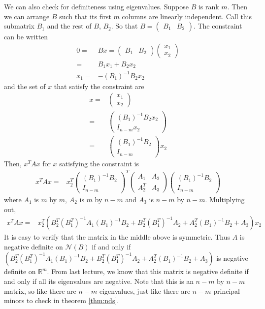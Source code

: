 \documentclass[12pt,reqno]{amsart}
\theoremstyle{definition}
\def\R{\mathbb{R}}
\begin{document}
We can also check for definiteness using eigenvalues. Suppose $B$ is
rank $m$. Then we can arrange $B$ such that its first $m$ columns are
linearly independent. Call this submatrix $B_1$ and the rest of $B$,
$B_2$. So that $B = \begin{pmatrix} B_1 & B_2 \end{pmatrix}$. The
constraint can be written
\begin{align*}
  0 = & B x = \begin{pmatrix} B_1 & B_2 \end{pmatrix} \begin{pmatrix}
    x_1 \\ x_2 \end{pmatrix} \\
  = & B_1 x_1 + B_2 x_2 \\
  x_1 = & -(B_1)^{-1} B_2 x_2
\end{align*}
and the set of $x$ that satisfy the constraint are
\begin{align*} x = & \begin{pmatrix} x_1 \\ x_2 \end{pmatrix} \\
  = & \begin{pmatrix}
    (B_1)^{-1} B_2 x_2 \\ I_{n-m} x_2 \end{pmatrix} \\
  = & \begin{pmatrix}
    (B_1)^{-1} B_2 \\ I_{n-m} \end{pmatrix} x_2
\end{align*}
Then, $x^T A x$ for $x$ satisfying the constraint is
\begin{align*}
  x^T A x = & x_2^T \begin{pmatrix}
    (B_1)^{-1} B_2 \\ I_{n-m} \end{pmatrix}^T \begin{pmatrix} A_1 & A_2
    \\ A_2^T & A_3 \end{pmatrix} \begin{pmatrix}
    (B_1)^{-1} B_2 \\ I_{n-m} \end{pmatrix}
\end{align*}
where $A_1$ is $m$ by $m$, $A_2$ is $m$ by $n-m$ and $A_3$ is $n-m$ by
$n-m$. Multiplying out,
\begin{align*}
  x^T A x = & x_2^T \left( B_2^T (B_1^T)^{-1} A_1 (B_1)^{-1} B_2 +
    B_2^T (B_1^T)^{-1} A_2 +  A_2^T (B_1)^{-1} B_2 + A_3\right) x_2
\end{align*}
It is easy to verify that the matrix in the middle above is
symmetric. Thus $A$ is negative definite on $\mathcal{N}(B)$ if and
only if $\left(B_2^T (B_1^T)^{-1} A_1 (B_1)^{-1} B_2 +
  B_2^T (B_1^T)^{-1} A_2 +  A_2^T (B_1)^{-1} B_2 + A_3\right)$ is
negative definite on $\R^m$. From last lecture, we know that this
matrix is negative definite if and only if all its eigenvalues are
negative. Note that this is an $n-m$ by $n-m$ matrix, so like there
are $n-m$ eigenvalues, just like there are $n-m$ principal minors to
check in theorem \ref{thm:nds}. 
\end{document}
